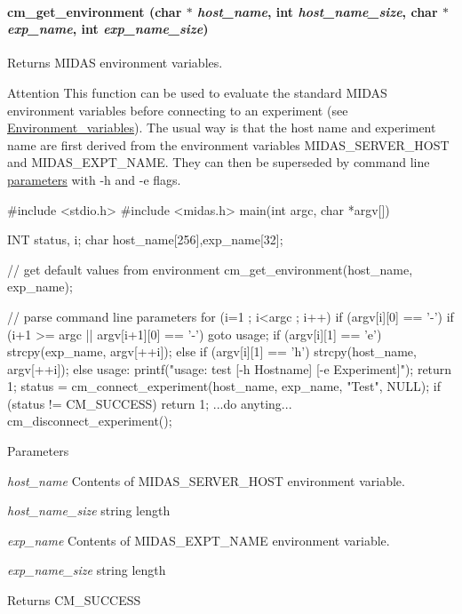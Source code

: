 \paragraph[{cm\_\-get\_\-environment}]{ cm\_\-get\_\-environment (char $\ast$ {\em host\_\-name}, \/  int {\em host\_\-name\_\-size}, \/  char $\ast$ {\em exp\_\-name}, \/  int {\em exp\_\-name\_\-size})}\hfill\label{group__cmfunctionc_gaa483e7c17ff962fd6cdfa581f4989f54}
Returns MIDAS environment variables. \begin{DoxyAttention}{Attention}
This function can be used to evaluate the standard MIDAS environment variables before connecting to an experiment (see \hyperlink{BuildingOptions_Environment_variables}{Environment\_\-variables}). The usual way is that the host name and experiment name are first derived from the environment variables MIDAS\_\-SERVER\_\-HOST and MIDAS\_\-EXPT\_\-NAME. They can then be superseded by command line \hyperlink{structparameters}{parameters} with -\/h and -\/e flags. 
\begin{DoxyCode}
#include <stdio.h>
#include <midas.h>
main(int argc, char *argv[])
{
  INT  status, i;
  char host_name[256],exp_name[32];

  // get default values from environment
  cm_get_environment(host_name, exp_name);

  // parse command line parameters
  for (i=1 ; i<argc ; i++)
    {
    if (argv[i][0] == '-')
      {
      if (i+1 >= argc || argv[i+1][0] == '-')
        goto usage;
      if (argv[i][1] == 'e')
        strcpy(exp_name, argv[++i]);
      else if (argv[i][1] == 'h')
        strcpy(host_name, argv[++i]);
      else
        {
usage:
        printf("usage: test [-h Hostname] [-e Experiment]\n\n");
        return 1;
        }
      }
    }
  status = cm_connect_experiment(host_name, exp_name, "Test", NULL);
  if (status != CM_SUCCESS)
    return 1;
    ...do anyting...
  cm_disconnect_experiment();
}
\end{DoxyCode}
 
\end{DoxyAttention}

\begin{DoxyParams}{Parameters}
\item[{\em host\_\-name}]Contents of MIDAS\_\-SERVER\_\-HOST environment variable. \item[{\em host\_\-name\_\-size}]string length \item[{\em exp\_\-name}]Contents of MIDAS\_\-EXPT\_\-NAME environment variable. \item[{\em exp\_\-name\_\-size}]string length \end{DoxyParams}
\begin{DoxyReturn}{Returns}
CM\_\-SUCCESS 
\end{DoxyReturn}


